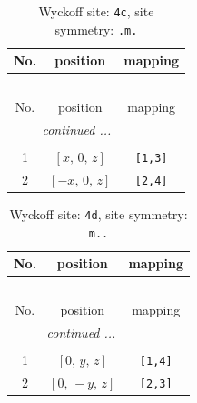 \documentclass[fleqn,8pt]{jsarticle}
\begin{document}
\begin{longtable}{ccc}
\caption{Wyckoff site: {\tt 4c}, site symmetry: {\tt .m.}}
 \\
 \hline \hline
No. & position & mapping \\ \hline \endfirsthead

\multicolumn{2}{l}{\tablename\ \thetable{}} \\
 \hline \hline
No. & position & mapping \\ \hline \endhead

 \hline \hline
\multicolumn{2}{r}{\footnotesize\it continued ...} \\ \endfoot

 \hline \hline
\multicolumn{2}{r}{} \\ \endlastfoot

1 & $\left[ x,\, 0,\, z \right]$ & {\tt [1,3]} \\ \hline
2 & $\left[ - x,\, 0,\, z \right]$ & {\tt [2,4]} \\
\end{longtable}
\renewcommand{\arraystretch}{1.2}
\begin{longtable}{ccc}
\caption{Wyckoff site: {\tt 4d}, site symmetry: {\tt m..}}
 \\
 \hline \hline
No. & position & mapping \\ \hline \endfirsthead

\multicolumn{2}{l}{\tablename\ \thetable{}} \\
 \hline \hline
No. & position & mapping \\ \hline \endhead

 \hline \hline
\multicolumn{2}{r}{\footnotesize\it continued ...} \\ \endfoot

 \hline \hline
\multicolumn{2}{r}{} \\ \endlastfoot

1 & $\left[ 0,\, y,\, z \right]$ & {\tt [1,4]} \\ \hline
2 & $\left[ 0,\, - y,\, z \right]$ & {\tt [2,3]} \\
\end{longtable}
\renewcommand{\arraystretch}{1.2}
\end{document}
